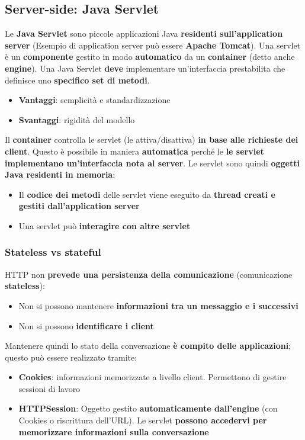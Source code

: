 \documentclass[12pt]{article}
\begin{document}
\subsection{Server-side: Java Servlet}
Le \textbf{Java Servlet} sono piccole applicazioni Java \textbf{residenti sull'application server} (Esempio di application server può essere \textbf{Apache Tomcat}).
Una servlet è un \textbf{componente} gestito in modo \textbf{automatico} da un \textbf{container} (detto anche \textbf{engine}).
Una Java Servlet \textbf{deve} implementare un'interfaccia prestabilita che definisce uno \textbf{specifico set di metodi}.
\begin{itemize}
    \item \textbf{Vantaggi}: semplicità e standardizzazione
    \item \textbf{Svantaggi}: rigidità del modello
\end{itemize}
Il \textbf{container} controlla le servlet (le attiva/disattiva) \textbf{in base alle richieste dei client}.
Questo è possibile in maniera \textbf{automatica} perché le \textbf{le servlet implementano un'interfaccia nota al server}.
Le servlet sono quindi \textbf{oggetti Java residenti in memoria}:
\begin{itemize}
    \item Il \textbf{codice dei metodi} delle servlet viene eseguito da \textbf{thread creati e gestiti dall'application server}
    \item Una servlet può \textbf{interagire con altre servlet}
\end{itemize}
\subsubsection{Stateless vs stateful}
HTTP non \textbf{prevede una persistenza della comunicazione} (comunicazione \textbf{stateless}):
\begin{itemize}
    \item Non si possono mantenere \textbf{informazioni tra un messaggio e i successivi}
    \item Non si possono \textbf{identificare i client}
\end{itemize}
Mantenere quindi lo stato della conversazione \textbf{è compito delle applicazioni}; questo può essere realizzato tramite:
\begin{itemize}
    \item \textbf{Cookies}: informazioni memorizzate a livello client. Permettono di gestire sessioni di lavoro
    \item \textbf{HTTPSession}: Oggetto gestito \textbf{automaticamente dall'engine} (con Cookies o riscrittura dell'URL). Le servlet \textbf{possono accedervi per memorizzare informazioni sulla conversazione} 
\end{itemize}
\end{document}
